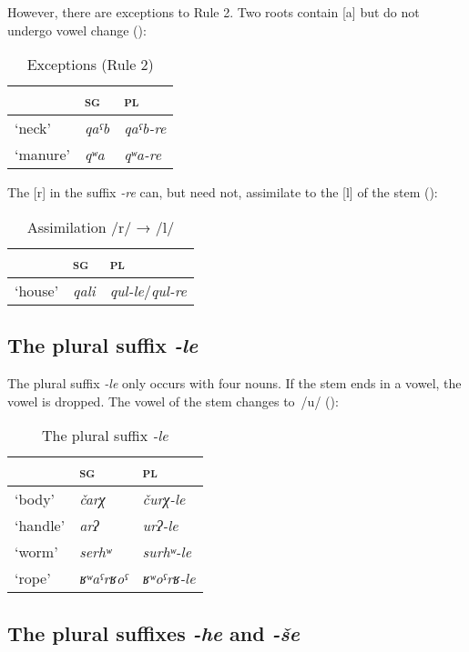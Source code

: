 ﻿\documentclass[output=paper]{langsci/langscibook}
\begin{document}
However, there are exceptions to Rule 2. Two roots contain [a] but
do not undergo vowel change ():

\begin{table}[H]
  \caption{Exceptions (Rule 2)}\label{tab:3:28}
\begin{tabular}{@{}lll@{}}
\toprule
& \textsc{sg} & \textsc{pl}\tabularnewline \midrule
`neck' & \emph{qaˤb} & \emph{qaˤb-re}\tabularnewline
`manure' & \emph{qʷa} & \emph{qʷa-re}\tabularnewline
\bottomrule
\end{tabular}
\end{table}

The [r] in the suffix \emph{-re} can, but need not, assimilate to the [l] of the
stem ():\vspace{-2\jot}

\begin{table}[h]
  \caption{Assimilation /r/ → /l/} \label{tab:3:29}
\begin{tabular}{@{}lll@{}}
\toprule
& \textsc{sg} & \textsc{pl}\tabularnewline \midrule
`house' & \emph{qali} & \emph{qul-le}/\emph{qul-re}\tabularnewline
\bottomrule
\end{tabular}
\vspace{-\jot}
\end{table}

\subsection{The plural suffix \emph{-le}}
\label{the-plural-suffix--le}

The plural suffix \emph{-le} only occurs with four nouns. If the stem ends
in a vowel, the vowel is dropped. The vowel of the stem changes to~/u/
():

\begin{table}[H]
  \caption{The plural suffix \emph{-le}}\label{tab:3:30}
\begin{tabular}{@{}lll@{}}
\toprule
& \textsc{sg} & \textsc{pl}\tabularnewline\midrule
`body' & \emph{čarχ} & \emph{čurχ-le}\tabularnewline
`handle' & \emph{arʔ} & \emph{urʔ-le}\tabularnewline
`worm' & \emph{serhʷ} & \emph{surhʷ-le}\tabularnewline
`rope' & \emph{ʁʷaˤrʁoˤ} & \emph{ʁʷoˤrʁ-le}\tabularnewline
\bottomrule
\end{tabular}
\end{table}

\subsection{The plural suffixes \emph{-he} and \emph{-še}}
\label{the-plural-suffixes--he-and--ux161e}
\end{document}
